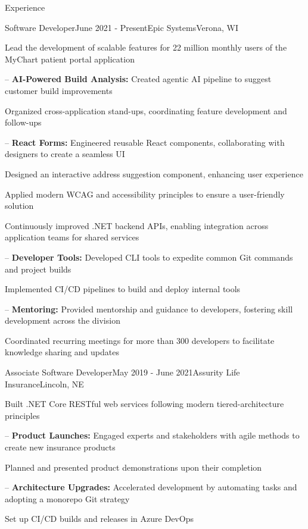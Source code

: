 \documentclass[
	10pt, %
]{article} %
\begin{document}
\printname

\begin{rSection}{Experience}

	\begin{rSubsection}{Software Developer}{June 2021 - Present}{Epic Systems}{Verona, WI}
		\item[] Lead the development of scalable features for 22 million monthly users of the MyChart patient portal application
		\item[--] \textbf{AI-Powered Build Analysis:} Created agentic AI pipeline to suggest customer build improvements
		\item Organized cross-application stand-ups, coordinating feature development and follow-ups
		\item[--] \textbf{React Forms:} Engineered reusable React components, collaborating with designers to create a seamless UI
		\item Designed an interactive address suggestion component, enhancing user experience
		\item Applied modern WCAG and accessibility principles to ensure a user-friendly solution
		\item Continuously improved .NET backend APIs, enabling integration across application teams for shared services
		\item[--] \textbf{Developer Tools:} Developed CLI tools to expedite common Git commands and project builds
		\item Implemented CI/CD pipelines to build and deploy internal tools
		\item[--] \textbf{Mentoring:} Provided mentorship and guidance to developers, fostering skill development across the division
		\item Coordinated recurring meetings for more than 300 developers to facilitate knowledge sharing and updates
	\end{rSubsection}

	\begin{rSubsection}{Associate Software Developer}{May 2019 - June 2021}{Assurity Life Insurance}{Lincoln, NE}
		\item[] Built .NET Core RESTful web services following modern tiered-architecture principles
		\item[--] \textbf{Product Launches:} Engaged experts and stakeholders with agile methods to create new insurance products
		\item Planned and presented product demonstrations upon their completion
		\item[--] \textbf{Architecture Upgrades:} Accelerated development by automating tasks and adopting a monorepo Git strategy
		\item Set up CI/CD builds and releases in Azure DevOps
	\end{rSubsection}


\end{rSection}
\end{document}
